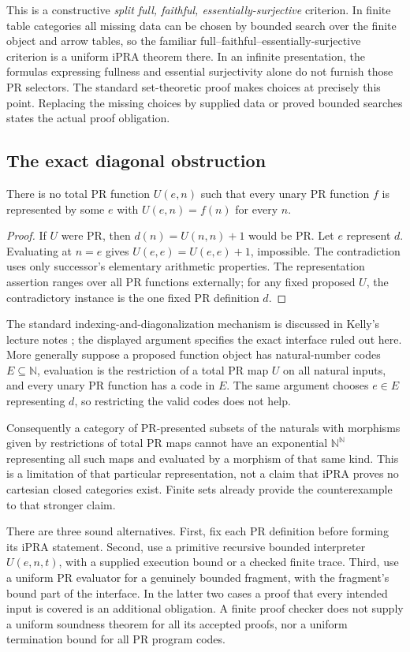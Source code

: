 This is a constructive \emph{split full, faithful, essentially-surjective}
criterion.  In finite table categories all missing data can be chosen by
bounded search over the finite object and arrow tables, so the familiar
full--faithful--essentially-surjective criterion is a uniform iPRA theorem
there.  In an infinite presentation, the formulas expressing fullness and
essential surjectivity alone do not furnish those PR selectors.  The standard
set-theoretic proof makes choices at precisely this point.  Replacing the
missing choices by supplied data or proved bounded searches states the actual
proof obligation.

\subsection{The exact diagonal obstruction}

\begin{proposition}
There is no total PR function $U(e,n)$ such that every unary PR function $f$ is
represented by some $e$ with $U(e,n)=f(n)$ for every $n$.
\end{proposition}
\begin{proof}
If $U$ were PR, then $d(n)=U(n,n)+1$ would be PR.  Let $e$ represent $d$.
Evaluating at $n=e$ gives $U(e,e)=U(e,e)+1$, impossible.  The contradiction uses
only successor's elementary arithmetic properties.  The representation
assertion ranges over all PR functions externally; for any fixed proposed
$U$, the contradictory instance is the one fixed PR definition $d$.
\end{proof}

The standard indexing-and-diagonalization mechanism is discussed in Kelly's
lecture notes \cite{kellyPR}; the displayed argument specifies the exact
interface ruled out here.  More generally suppose a proposed function object
has natural-number codes $E\subseteq\mathbb N$, evaluation is the restriction of
a total PR map $U$ on all natural inputs, and every unary PR function has a code
in $E$.  The same argument chooses $e\in E$ representing $d$, so restricting
the valid codes does not help.

Consequently a category of PR-presented subsets of the naturals with morphisms
given by restrictions of total PR maps cannot have an exponential
$\mathbb N^{\mathbb N}$ representing all such maps and evaluated by a morphism
of that same kind.  This is a limitation of that particular representation,
not a claim that iPRA proves no cartesian closed categories exist.  Finite sets
already provide the counterexample to that stronger claim.

There are three sound alternatives.  First, fix each PR definition before
forming its iPRA statement.  Second, use a primitive recursive bounded
interpreter $U(e,n,t)$, with a supplied execution bound or a checked finite
trace.  Third, use a uniform PR evaluator for a genuinely bounded fragment,
with the fragment's bound part of the interface.  In the latter two cases a
proof that every intended input is covered is an additional obligation.  A
finite proof checker does not supply a uniform soundness theorem for all its
accepted proofs, nor a uniform termination bound for all PR program codes.
